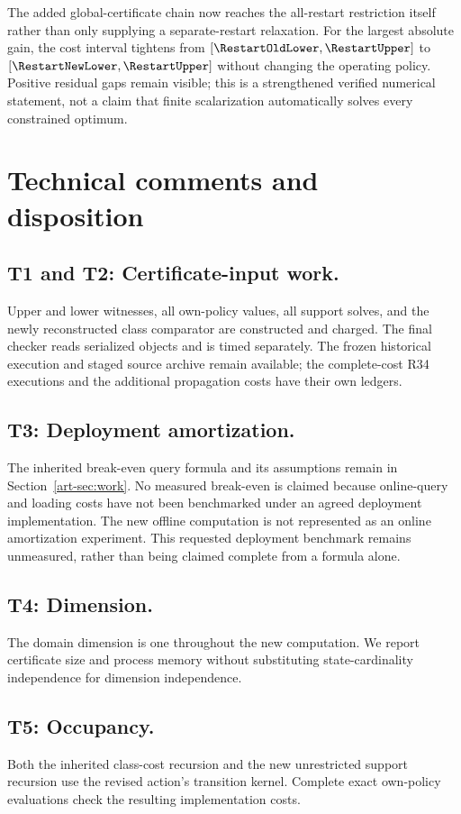 The added global-certificate chain now reaches the all-restart restriction itself rather than only supplying a separate-restart relaxation. For the largest absolute gain, the cost interval tightens from $[\RestartOldLower,\RestartUpper]$ to $[\RestartNewLower,\RestartUpper]$ without changing the operating policy. Positive residual gaps remain visible; this is a strengthened verified numerical statement, not a claim that finite scalarization automatically solves every constrained optimum.

\section{Technical comments and disposition}
\subsection{T1 and T2: Certificate-input work.}
Upper and lower witnesses, all own-policy values, all support solves, and the newly reconstructed class comparator are constructed and charged. The final checker reads serialized objects and is timed separately. The frozen historical execution and staged source archive remain available; the complete-cost R34 executions and the additional propagation costs have their own ledgers.

\subsection{T3: Deployment amortization.}
The inherited break-even query formula and its assumptions remain in Section~\ref{art-sec:work}. No measured break-even is claimed because online-query and loading costs have not been benchmarked under an agreed deployment implementation. The new offline computation is not represented as an online amortization experiment. This requested deployment benchmark remains unmeasured, rather than being claimed complete from a formula alone.

\subsection{T4: Dimension.}
The domain dimension is one throughout the new computation. We report certificate size and process memory without substituting state-cardinality independence for dimension independence.

\subsection{T5: Occupancy.}
Both the inherited class-cost recursion and the new unrestricted support recursion use the revised action's transition kernel. Complete exact own-policy evaluations check the resulting implementation costs.

